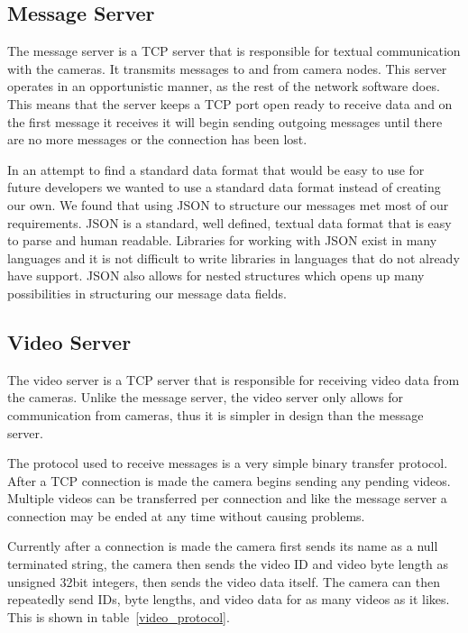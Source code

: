 
\subsection{Message Server}

The message server is a TCP server that is responsible for textual communication
with the cameras. It transmits messages to and from camera nodes. This server
operates in an opportunistic manner, as the rest of the network software does.
This means that the server keeps a TCP port open ready to receive data and on
the first message it receives it will begin sending outgoing messages until
there are no more messages or the connection has been lost.

In an attempt to find a standard data format that would be easy to use for
future developers we wanted to use a standard data format instead of creating
our own. We found that using JSON to structure our messages met most of our
requirements. JSON is a standard, well defined, textual data format that is easy
to parse and human readable. Libraries for working with JSON exist in many
languages and it is not difficult to write libraries in languages that do not
already have support. JSON also allows for nested structures which opens up many
possibilities in structuring our message data fields.


\subsection{Video Server}

The video server is a TCP server that is responsible for receiving video data
from the cameras. Unlike the message server, the video server only allows for
communication from cameras, thus it is simpler in design than the message
server.

The protocol used to receive messages is a very simple binary transfer protocol.
After a TCP connection is made the camera begins sending any pending videos.
Multiple videos can be transferred per connection and like the
message server a connection may be ended at any time without causing problems.

Currently after a connection is made the camera first sends its name as a null
terminated string, the camera then sends the video ID and video byte length as
unsigned 32bit integers, then sends the video data itself.  The camera can then
repeatedly send IDs, byte lengths, and video data for as many videos as it
likes. This is shown in table~\ref{video_protocol}.

